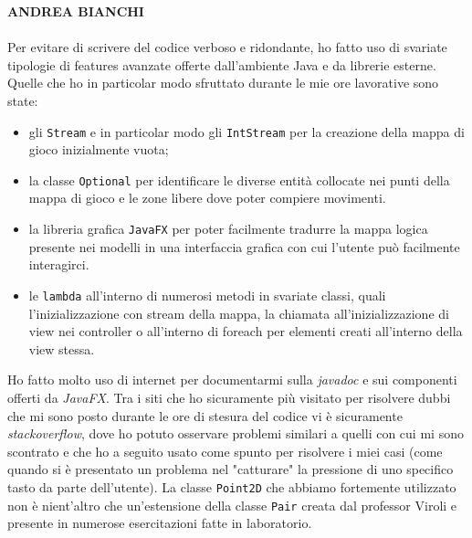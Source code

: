 \documentclass[a4paper,12pt]{report}
\begin{document}
\textbf{ANDREA BIANCHI}
\\ \\
Per evitare di scrivere del codice verboso e ridondante, ho fatto uso di svariate tipologie di features avanzate offerte dall'ambiente Java e da librerie esterne. 
Quelle che ho in particolar modo sfruttato durante le mie ore lavorative sono state:
\begin{itemize}
    \item gli \verb|Stream| e in particolar modo gli \verb|IntStream| per la creazione della mappa di gioco inizialmente vuota;
    \item la classe \verb|Optional| per identificare le diverse entità collocate nei punti della mappa di gioco e le zone libere dove poter compiere movimenti.
    \item la libreria grafica \verb|JavaFX| per poter facilmente tradurre la mappa logica presente nei modelli in una interfaccia grafica con cui l'utente può facilmente interagirci.
    \item le \verb|lambda| all'interno di numerosi metodi in svariate classi, quali l'inizializzazione con stream della mappa, la chiamata all'inizializzazione di view nei controller o all'interno di foreach per elementi creati all'interno della view stessa.
\end{itemize}
Ho fatto molto uso di internet per documentarmi sulla \textit{javadoc} e sui componenti offerti da \textit{JavaFX}. Tra i siti che ho sicuramente più visitato per risolvere dubbi che mi sono posto durante le ore di stesura del codice vi è sicuramente \textit{stackoverflow}, dove ho potuto osservare problemi similari a quelli con cui mi sono scontrato e che ho a seguito usato come spunto per risolvere i miei casi (come quando si è presentato un problema nel "catturare" la pressione di uno specifico tasto da parte dell'utente). La classe \verb|Point2D| che abbiamo fortemente utilizzato non è nient'altro che un'estensione della classe \verb|Pair| creata dal professor Viroli e presente in numerose esercitazioni fatte in laboratorio.
\end{document}

